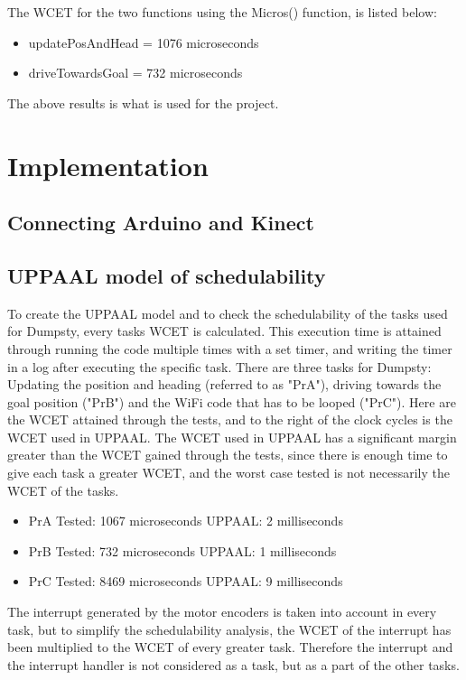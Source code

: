 The WCET for the two functions using the Micros() function, is listed below:
\begin{itemize}
	\item updatePosAndHead = 1076 microseconds
	\item driveTowardsGoal = 732 microseconds
\end{itemize}

The above results is what is used for the project.
\section{Implementation}
\label{sec:i3Implementation}

\subsection{Connecting Arduino and Kinect}
\label{sec:i3Connecting Arduino and Kinect implementation}

\subsection{UPPAAL model of schedulability}
\label{sec:i3UPPAAL model}
To create the UPPAAL model and to check the schedulability of the tasks used for Dumpsty, every tasks WCET is calculated. This execution time is attained through running the code multiple times with a set timer, and writing the timer in a log after executing the specific task. There are three tasks for Dumpsty: Updating the position and heading (referred to as "PrA"), driving towards the goal position ("PrB") and the WiFi code that has to be looped ("PrC"). Here are the WCET attained through the tests, and to the right of the clock cycles is the WCET used in UPPAAL. The WCET used in UPPAAL has a significant margin greater than the WCET gained through the tests, since there is enough time to give each task a greater WCET, and the worst case tested is not necessarily the WCET of the tasks. 

\begin{itemize}
	\item PrA \tab Tested: 1067 microseconds \tab UPPAAL: 2 milliseconds
	\item PrB \tab Tested: 732  microseconds \tab UPPAAL: 1 milliseconds
	\item PrC \tab	Tested: 8469 microseconds \tab UPPAAL: 9 milliseconds
\end{itemize}

The interrupt generated by the motor encoders is taken into account in every task, but to simplify the schedulability analysis, the WCET of the interrupt has been multiplied to the WCET of every greater task. Therefore the interrupt and the interrupt handler is not considered as a task, but as a part of the other tasks.


